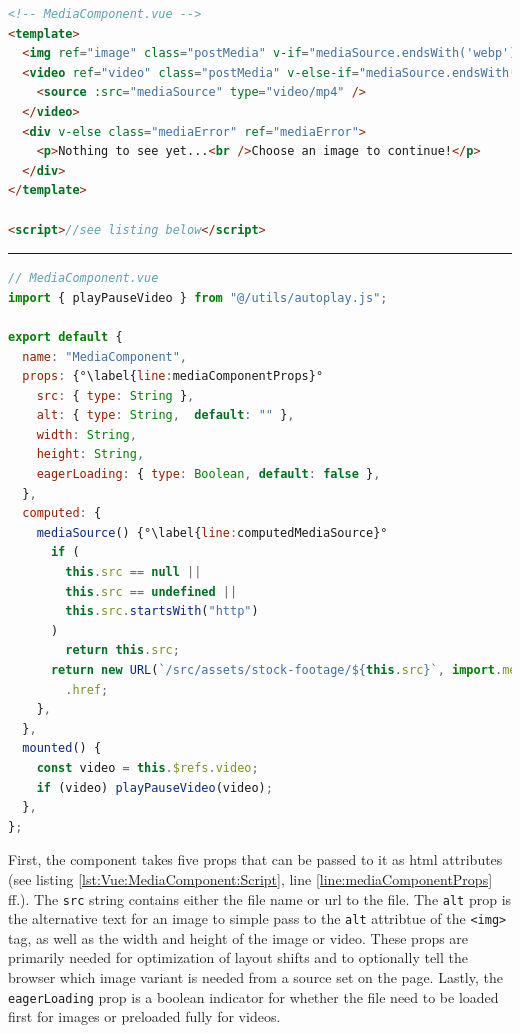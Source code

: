 \documentclass[a4paper, 12pt]{article}
\begin{document}
\vspace{1cm}
\begin{lstlisting}[caption=MediaComponent in Vue.js (Template), label={lst:Vue:MediaComponent:Template}, language=HTML]
<!-- MediaComponent.vue -->
<template>
  <img ref="image" class="postMedia" v-if="mediaSource.endsWith('webp')" :alt="alt" :width="width" :height="height" :loading="eagerLoading ? 'eager' : 'lazy'" :src="mediaSource" />
  <video ref="video" class="postMedia" v-else-if="mediaSource.endsWith('mp4')" :width="width" :preload="eagerLoading ? 'auto' : 'metadata'" controls controlslist="nodownload,nofullscreen,noremoteplayback" disablepictureinpicture loop muted >
    <source :src="mediaSource" type="video/mp4" />
  </video>
  <div v-else class="mediaError" ref="mediaError">
    <p>Nothing to see yet...<br />Choose an image to continue!</p>
  </div>
</template>
  
<script>//see listing below</script>
\end{lstlisting}
\hrule
\begin{lstlisting}[caption=MediaComponent in Vue.js (Script), label={lst:Vue:MediaComponent:Script}, language=JavaScript, firstnumber=13, escapechar=°]
// MediaComponent.vue
import { playPauseVideo } from "@/utils/autoplay.js";

export default {
  name: "MediaComponent",
  props: {°\label{line:mediaComponentProps}°
    src: { type: String },
    alt: { type: String,  default: "" },
    width: String,
    height: String,
    eagerLoading: { type: Boolean, default: false },
  },
  computed: {
    mediaSource() {°\label{line:computedMediaSource}°
      if (
        this.src == null ||
        this.src == undefined ||
        this.src.startsWith("http")
      )
        return this.src;
      return new URL(`/src/assets/stock-footage/${this.src}`, import.meta.url)
        .href;
    },
  },
  mounted() {
    const video = this.$refs.video;
    if (video) playPauseVideo(video);
  },
};
\end{lstlisting}
\vspace{1cm}

First, the component takes five props that can be passed to it as \acrshort{html} attributes (see listing \ref{lst:Vue:MediaComponent:Script}, line \ref{line:mediaComponentProps} ff.).
The \verb|src| string contains either the file name or \acrshort{url} to the file.
The \verb|alt| prop is the alternative text for an image to simple pass to the \verb|alt| attribtue of the \verb|<img>| tag, as well as the width and height of the image or video.
These props are primarily needed for optimization of layout shifts and to optionally tell the browser which image variant is needed from a source set on the page.
Lastly, the \verb|eagerLoading| prop is a boolean indicator for whether the file need to be loaded first for images or preloaded fully for videos.
\end{document}
